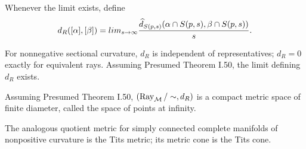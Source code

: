 \begin{definition}
\label{def:chow-iii-i53-ray-distance}
Whenever the limit exists, define
\[
d_R([\alpha],[\beta])=lim_{s\to\infty}
\frac{\widehat d_{S(p,s)}(\alpha\cap S(p,s),\beta\cap S(p,s))}{s}.
\]
\end{definition}

\begin{lemma}
\label{lem:chow-iii-i53-ray-distance-well-defined}
For nonnegative sectional curvature, $d_R$ is independent of representatives;
$d_R=0$ exactly for equivalent rays.  Assuming Presumed Theorem I.50, the
limit defining $d_R$ exists.
\end{lemma}

\begin{claim}
\label{clm:chow-iii-i54-points-at-infinity}
Assuming Presumed Theorem I.50, $(\Ray_{\M}/\sim,d_R)$ is a compact metric space of
finite diameter, called the space of points at infinity.
\end{claim}

\begin{remark}
\label{rem:chow-iii-i55-tits-metric}
The analogous quotient metric for simply connected complete manifolds of
nonpositive curvature is the Tits metric; its metric cone is the Tits cone.
\end{remark}

